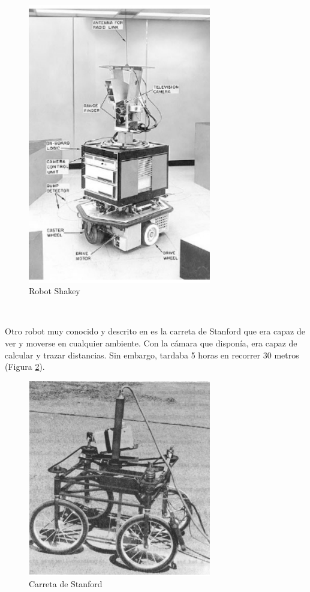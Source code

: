 \begin{figure} [h!]
	\begin{center}
		\includegraphics[width=8cm]{figs/shakey.png}
	\end{center}
	\caption{Robot Shakey} %
	\label{fig:shakey}
\end{figure}\


Otro robot muy conocido  y descrito en \cite{earnest2012stanfordcart} es la carreta de Stanford que era capaz de ver y moverse en cualquier ambiente. Con la cámara que disponía, era capaz de calcular y trazar distancias. Sin embargo, tardaba 5 horas en recorrer 30 metros (Figura \ref{fig:stanford}). 

\begin{figure} [h!]
	\begin{center}
		\includegraphics[width=8cm]{figs/stanford.png}
	\end{center}
	\caption{Carreta de Stanford}
	\label{fig:stanford}
\end{figure}\


